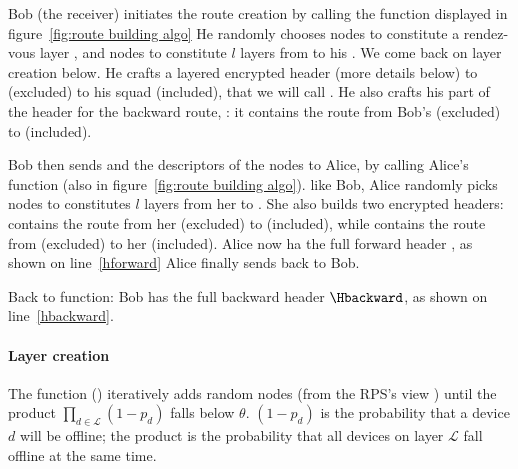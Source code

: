 Bob (the receiver) initiates the route creation by calling the \Recv function displayed in figure~\ref{fig:route building algo}
He randomly chooses nodes to constitute a rendez-vous layer \LRV, and nodes to constitute $l$ layers from \LRV to his \squad. 
We come back on layer creation below.
He crafts a layered encrypted header (more details below) to \LRV (excluded) to his squad (included), that we will call \Hrecforward.
He also crafts his part of the header for the backward route, \Hrecbackward: it contains the route from Bob's \squad (excluded) to \LRV (included).

Bob then sends \Hrecforward and the descriptors of the \LRV nodes to Alice, by calling Alice's \Send function (also in figure~\ref{fig:route building algo}).
like Bob, Alice randomly picks nodes to constitutes $l$ layers from her \squad to \LRV.
She also builds two encrypted headers: \Hsendforward contains the route from her \squad (excluded) to \LRV (included), while \Hsendbackward contains the route from \LRV (excluded) to her \squad (included).
Alice now ha the full forward header \Hforward, as shown on line~\ref{hforward}
Alice finally sends \Hsendbackward back to Bob.

Back to \Recv function: Bob has the full backward header $\Hbackward$, as shown on line~\ref{hbackward}.


\paragraph*{Layer creation}
The function \CreateOnionLayer() iteratively adds random nodes (from the RPS's view \view) until the product $\prod_{d\in \mathcal{L}} (1 - p_d)$ falls below $\theta$.
$(1 - p_d)$ is the probability that a device $d$ will be offline; the product is the probability that all devices on layer $\mathcal{L}$ fall offline at the same time.


\begin{table}[t]
\label{tab:parameters}
\end{table}


